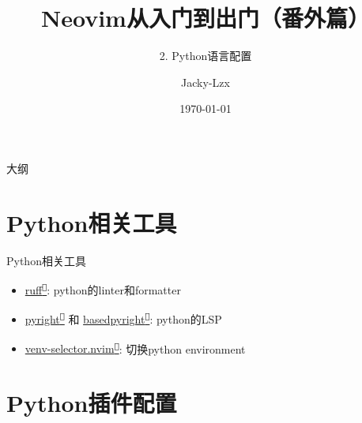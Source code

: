 \documentclass[aspectratio=169]{ctexbeamer}
\title{Neovim从入门到出门（番外篇）}
\subtitle{2. Python语言配置}
\author{Jacky-Lzx}
\date{\today}
\newcommand{\nerd}[1]{\texttt{#1}}
\newcommand{\link}[3][]{\href{#3}{#2\textsuperscript{\nerd{}}}}
\begin{document}
\begin{frame}
  \titlepage
\end{frame}
\begin{frame}{大纲}
  \tableofcontents
\end{frame}

\section{Python相关工具}

\begin{frame}{Python相关工具}

  \begin{itemize}
    \item \link{ruff}{https://github.com/astral-sh/ruff}: python的linter和formatter
    \item
      \link{pyright}{https://github.com/microsoft/pyright} 和
      \link{basedpyright}{https://github.com/DetachHead/basedpyright}:
      python的LSP

    \item \link{venv-selector.nvim}{https://github.com/linux-cultist/venv-selector.nvim}: 切换python environment
  \end{itemize}

\end{frame}

\section{Python插件配置}
\end{document}

